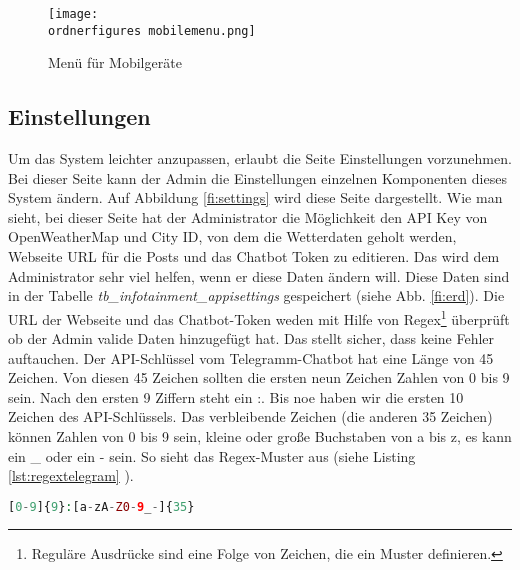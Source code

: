 \begin{figure}[H]
	\centering
	\texttt{[image: \\ordnerfigures mobilemenu.png]}
	\caption{Men\"u für Mobilgeräte}
	\label{fi:mobilemenu}
\end{figure}



\subsection{Einstellungen}
Um das System leichter anzupassen, erlaubt die Seite Einstellungen vorzunehmen. Bei dieser Seite kann der Admin die Einstellungen einzelnen Komponenten dieses System ändern. Auf Abbildung \ref{fi:settings} wird diese Seite dargestellt. Wie man sieht, bei dieser Seite hat der Administrator die Möglichkeit den API Key von OpenWeatherMap und City ID, von dem die Wetterdaten geholt werden, Webseite URL für die Posts und das Chatbot Token zu editieren. Das wird dem Administrator sehr viel helfen, wenn er diese Daten ändern will. Diese Daten sind in der Tabelle \textit{tb\_infotainment\_appisettings} gespeichert (siehe Abb. \ref{fi:erd}). Die URL der Webseite und das Chatbot-Token weden mit Hilfe von Regex\footnote{Reguläre Ausdrücke sind eine Folge von Zeichen, die ein Muster definieren.} überprüft ob der Admin valide Daten hinzugefügt hat. Das stellt sicher, dass keine Fehler auftauchen. Der API-Schlüssel vom Telegramm-Chatbot hat eine Länge von 45 Zeichen. Von diesen 45 Zeichen sollten die ersten neun Zeichen Zahlen von 0 bis 9 sein. Nach den ersten 9 Ziffern steht ein :. Bis noe haben wir die ersten 10 Zeichen des API-Schlüssels. Das verbleibende Zeichen (die anderen 35 Zeichen) können Zahlen von 0 bis 9 sein, kleine oder große Buchstaben von a bis z, es kann ein \_ oder ein - sein. So sieht das Regex-Muster aus (siehe Listing \ref{lst:regextelegram} ).
\begin{lstlisting}[caption={Regex Muster für Telegram Chatbot API-Key},label={lst:regextelegram},language=PHP]
[0-9]{9}:[a-zA-Z0-9_-]{35}
\end{lstlisting}

